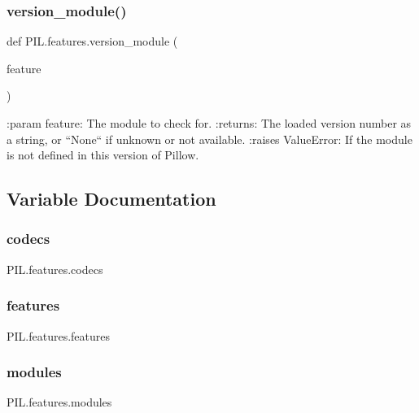 \subsubsection{\texorpdfstring{version\+\_\+module()}{version\_module()}}
{\footnotesize\ttfamily def P\+I\+L.\+features.\+version\+\_\+module (\begin{DoxyParamCaption}\item[{}]{feature }\end{DoxyParamCaption})}

\begin{DoxyVerb}:param feature: The module to check for.
:returns:
    The loaded version number as a string, or ``None`` if unknown or not available.
:raises ValueError: If the module is not defined in this version of Pillow.
\end{DoxyVerb}
 

\subsection{Variable Documentation}
\mbox{\label{namespacePIL_1_1features_a7a095b9622e9a683d6077402910bb638}} 
\subsubsection{\texorpdfstring{codecs}{codecs}}
{\footnotesize\ttfamily P\+I\+L.\+features.\+codecs}

\mbox{\label{namespacePIL_1_1features_ac781694a3f6fd5be1670197ebf8d7800}} 
\subsubsection{\texorpdfstring{features}{features}}
{\footnotesize\ttfamily P\+I\+L.\+features.\+features}

\mbox{\label{namespacePIL_1_1features_a830cab01c2c555e90ffe1986646609d0}} 
\subsubsection{\texorpdfstring{modules}{modules}}
{\footnotesize\ttfamily P\+I\+L.\+features.\+modules}

